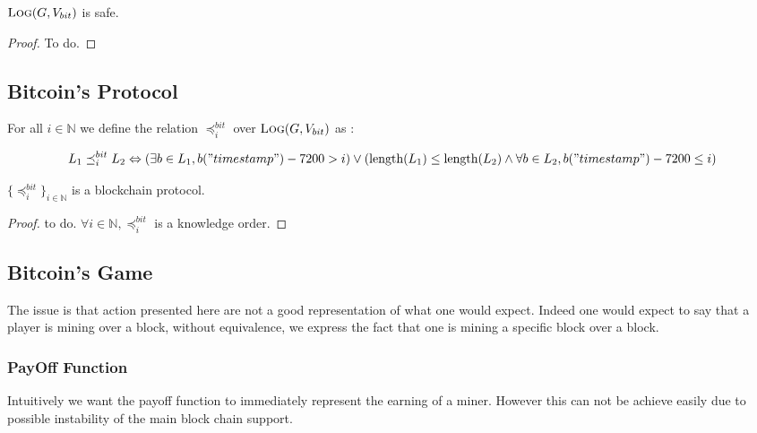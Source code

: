 \begin{myprop}
	$\text{\sc Log}(G,V_{bit})$ is safe.
\end{myprop}

\begin{proof}
	To do.
\end{proof}

\subsection{Bitcoin's Protocol}

For all $i \in \mathbb{N}$ we define the relation $\preceq^{bit}_i$ over $\text{\sc Log}(G,V_{bit})$ as : 

$$ L_1 \preceq^{bit}_i L_2  \Leftrightarrow \left ( \exists b \in L_1, b("timestamp") - 7200 > i \right ) \lor \left ( \text{\rm length}(L_1) \leq \text{\rm length}(L_2) \land \forall b \in L_2, b("timestamp") - 7200 \leq i \right )$$

\begin{myprop}
	$\{\preceq^{bit}_i\}_{i\in\mathbb{N}}$ is a blockchain protocol.
\end{myprop}

\begin{proof}
	to do.
	$\forall i\in \mathbb{N}, \preceq^{bit}_i$ is a knowledge order.
\end{proof}

\subsection{Bitcoin's Game}

The issue is that action presented here are not a good representation of what one would expect. Indeed one would expect to say that a player is mining over a block, without equivalence, we express the fact that one is mining a specific block over a block.


\subsubsection{PayOff Function}
Intuitively we want the payoff function to immediately represent the earning of a miner. However this can not be achieve easily due to possible instability of the main block chain support. 

